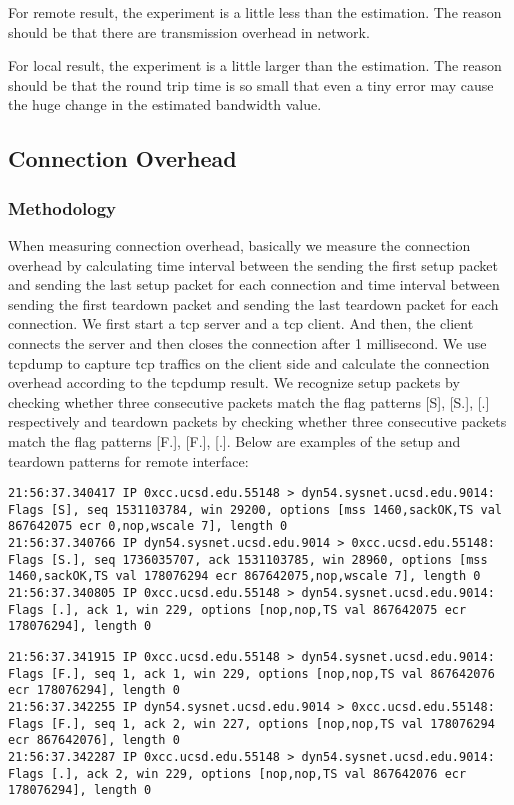 For remote result, the experiment is a little less than the estimation. The reason should be that there are transmission overhead in network.

For local result, the experiment is a little larger than the estimation. The reason should be that the round trip time is so small that even a tiny error may cause the huge change in the estimated bandwidth value.

\subsection{Connection Overhead}

\subsubsection{Methodology}
When measuring connection overhead, basically we measure the connection overhead by calculating time interval between the sending the first setup packet and sending the last setup packet for each connection and time interval between sending the first teardown packet and sending the last teardown packet for each connection. We first start a tcp server and a tcp client. And then, the client connects the server and then closes the connection after 1 millisecond. We use tcpdump to capture tcp traffics on the client side and calculate the connection overhead according to the tcpdump result.  We recognize setup packets by checking whether three consecutive packets match the flag patterns [S], [S.], [.] respectively and teardown packets by checking whether three consecutive packets match the flag patterns [F.], [F.], [.]. Below are examples of the setup and teardown patterns for remote interface:

\begin{lstlisting}
21:56:37.340417 IP 0xcc.ucsd.edu.55148 > dyn54.sysnet.ucsd.edu.9014: Flags [S], seq 1531103784, win 29200, options [mss 1460,sackOK,TS val 867642075 ecr 0,nop,wscale 7], length 0
21:56:37.340766 IP dyn54.sysnet.ucsd.edu.9014 > 0xcc.ucsd.edu.55148: Flags [S.], seq 1736035707, ack 1531103785, win 28960, options [mss 1460,sackOK,TS val 178076294 ecr 867642075,nop,wscale 7], length 0
21:56:37.340805 IP 0xcc.ucsd.edu.55148 > dyn54.sysnet.ucsd.edu.9014: Flags [.], ack 1, win 229, options [nop,nop,TS val 867642075 ecr 178076294], length 0
\end{lstlisting}

\begin{lstlisting}
21:56:37.341915 IP 0xcc.ucsd.edu.55148 > dyn54.sysnet.ucsd.edu.9014: Flags [F.], seq 1, ack 1, win 229, options [nop,nop,TS val 867642076 ecr 178076294], length 0
21:56:37.342255 IP dyn54.sysnet.ucsd.edu.9014 > 0xcc.ucsd.edu.55148: Flags [F.], seq 1, ack 2, win 227, options [nop,nop,TS val 178076294 ecr 867642076], length 0
21:56:37.342287 IP 0xcc.ucsd.edu.55148 > dyn54.sysnet.ucsd.edu.9014: Flags [.], ack 2, win 229, options [nop,nop,TS val 867642076 ecr 178076294], length 0
\end{lstlisting}

